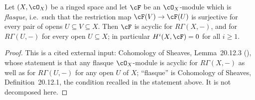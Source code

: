\begin{lemma}
\label{lem:pc-flasque-acyclic}
Let $(X,\cO_X)$ be a ringed space and let $\cF$ be an $\cO_X$-module
which is \emph{flasque}, i.e.\ such that the restriction map
$\cF(V)\to\cF(U)$ is surjective for every pair of opens
$U\subseteq V\subseteq X$.  Then $\cF$ is acyclic for
$R\Gamma(X,-)$, and for $R\Gamma(U,-)$ for every open $U\subseteq X$;
in particular $H^i(X,\cF)=0$ for all $i\ge1$.
\end{lemma}
\begin{proof}
This is a cited external input: Cohomology of Sheaves,
Lemma~20.12.3 (), whose statement is that any
flasque $\cO_X$-module is acyclic for $R\Gamma(X,-)$ as well as for
$R\Gamma(U,-)$ for any open $U$ of $X$; ``flasque'' is Cohomology of
Sheaves, Definition~20.12.1, the condition recalled in the statement
above.  It is not decomposed here.
\end{proof}

